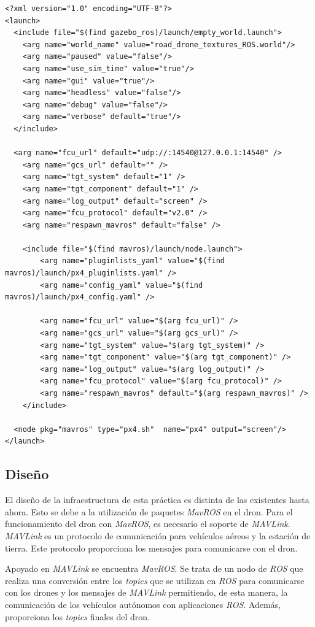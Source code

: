 \lstset{language=XML, breaklines=true, basicstyle=\footnotesize}
\begin{lstlisting}[frame=single]
<?xml version="1.0" encoding="UTF-8"?>
<launch>
  <include file="$(find gazebo_ros)/launch/empty_world.launch">
    <arg name="world_name" value="road_drone_textures_ROS.world"/>
    <arg name="paused" value="false"/>
    <arg name="use_sim_time" value="true"/>
    <arg name="gui" value="true"/>
    <arg name="headless" value="false"/>
    <arg name="debug" value="false"/>
    <arg name="verbose" default="true"/>
  </include>

  <arg name="fcu_url" default="udp://:14540@127.0.0.1:14540" />
	<arg name="gcs_url" default="" />
	<arg name="tgt_system" default="1" />
	<arg name="tgt_component" default="1" />
	<arg name="log_output" default="screen" />
	<arg name="fcu_protocol" default="v2.0" />
	<arg name="respawn_mavros" default="false" />

	<include file="$(find mavros)/launch/node.launch">
		<arg name="pluginlists_yaml" value="$(find mavros)/launch/px4_pluginlists.yaml" />
		<arg name="config_yaml" value="$(find mavros)/launch/px4_config.yaml" />

		<arg name="fcu_url" value="$(arg fcu_url)" />
		<arg name="gcs_url" value="$(arg gcs_url)" />
		<arg name="tgt_system" value="$(arg tgt_system)" />
		<arg name="tgt_component" value="$(arg tgt_component)" />
		<arg name="log_output" value="$(arg log_output)" />
		<arg name="fcu_protocol" value="$(arg fcu_protocol)" />
		<arg name="respawn_mavros" default="$(arg respawn_mavros)" />
	</include>

  <node pkg="mavros" type="px4.sh"  name="px4" output="screen"/>
</launch>
\end{lstlisting}

\subsection{Diseño}
El diseño de la infraestructura de esta práctica es distinta de las existentes hasta ahora. Esto se debe a la utilización de paquetes \textit{MavROS} en el dron. Para el funcionamiento del dron con \textit{MavROS}, es necesario el soporte de \textit{MAVLink}. \textit{MAVLink} es un protocolo de comunicación para vehículos aéreos y la estación de tierra. Este protocolo proporciona los mensajes para comunicarse con el dron. 

Apoyado en \textit{MAVLink} se encuentra \textit{MavROS}. Se trata de un nodo de \textit{ROS} que realiza una conversión entre los \textit{topics} que se utilizan en \textit{ROS} para comunicarse con los drones y los mensajes de \textit{MAVLink} permitiendo, de esta manera, la comunicación de los vehículos autónomos con aplicaciones \textit{ROS}. Además, proporciona los \textit{topics} finales del dron.

